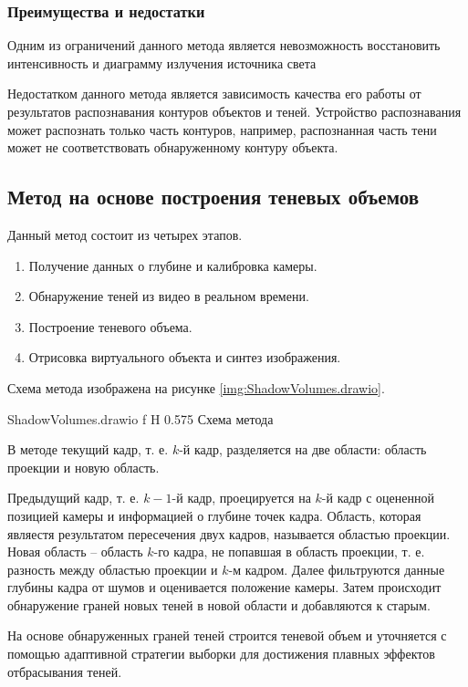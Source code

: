 \subsubsection*{Преимущества и недостатки}

Одним из ограничений данного метода является невозможность восстановить интенсивность и диаграмму излучения источника света

Недостатком данного метода является зависимость качества его работы от результатов распознавания контуров объектов и теней. Устройство распознавания может распознать только часть контуров, например, распознанная часть тени может не соответствовать обнаруженному контуру объекта. 

\subsection{Метод на основе построения теневых объемов}

Данный метод состоит из четырех этапов.

\begin{enumerate}
	\item Получение данных о глубине и калибровка камеры.
	\item Обнаружение теней из видео в реальном времени.
	\item Построение теневого объема.
	\item Отрисовка виртуального объекта и синтез изображения.
\end{enumerate}

Схема метода изображена на рисунке \ref{img:ShadowVolumes.drawio}.

{ShadowVolumes.drawio}
{f}
{H}
{0.575\textwidth}
{Схема метода}

В методе текущий кадр, т. е. $k$-й кадр, разделяется на две области: область проекции и новую область. 

Предыдущий кадр, т. е. $k-1$-й кадр, проецируется на $k$-й кадр с оцененной позицией камеры и информацией о глубине точек кадра. Область, которая являестя результатом пересечения двух кадров, называется областью проекции. Новая область -- область $k$-го кадра, не попавшая в область проекции, т. е. разность между областью проекции и $k$-м кадром. Далее фильтруются данные глубины кадра от шумов и оценивается положение камеры. Затем происходит обнаружение граней новых теней в новой области и добавляются к старым. 

На основе обнаруженных граней теней строится теневой объем и уточняется с помощью адаптивной стратегии выборки \cite{THOMASIAN2022385} для достижения плавных эффектов отбрасывания теней.

